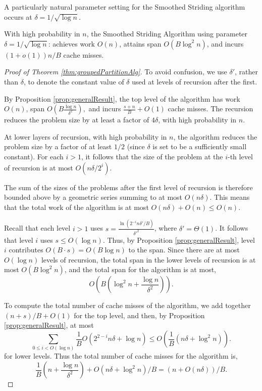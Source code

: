 \documentclass[a4paper,UKenglish,cleveref, autoref, thm-restate]{lipics-v2019}
\begin{document}
A particularly natural parameter setting for the 
Smoothed Striding algorithm occurs at $\delta = 1 / \sqrt{\log n}$.
\begin{corollary}
  \label{cor:groupedPartitionAlg} With high probability in $n$,
  the Smoothed Striding Algorithm using parameter
  $\delta=1/\sqrt{\log n}$: achieves work $O(n)$, attains span
  $O(B\log^2 n)$, and incurs $(1 + o(1))n/B$ cache misses. 
\end{corollary}

\begin{proof}[Proof of Theorem \ref{thm:groupedPartitionAlg}]
  To avoid confusion, we use $\delta'$, rather than $\delta$, to
  denote the constant value of $\delta$ used at levels of recursion
  after the first.
  
  
  By Proposition \ref{prop:generalResult}, the top level of the algorithm
  has work $O(n)$, span $O\left(B\frac{\log n}{\delta^2}\right),$ and
  incurs $\frac{s+n}{B} + O(1)$ cache misses.  The recursion reduces
  the problem size by at least a factor of $4\delta$, with high
  probability in $n$.

  At lower layers of recursion, with high probability in $n$, the
  algorithm reduces the problem size by a factor of at least
  $1/2$ (since $\delta$ is set to be a sufficiently small
  constant). For each $i > 1$, it follows that the size of the
  problem at the $i$-th level of recursion is at most $O(n \delta
  / 2^i)$.
  
  The sum of the sizes of the problems after the first level of
  recursion is therefore bounded above by a geometric series summing to at most $O(n
  \delta)$. This means that the total work of the algorithm is at most
  $O(n\delta) + O(n) \le O(n)$.

  Recall that each level $i > 1$ uses $s =
  \frac{\ln(2^{-i}n\delta'/B)}{\delta'^2}$, where $\delta' =
  \Theta(1)$. It follows that level $i$ uses $s \le O(\log n)$.
  Thus, by Proposition \ref{prop:generalResult}, level $i$
  contributes $O(B\cdot s)=O(B \log n)$ to the span.  Since there
  are at most  $O(\log n)$ levels of recursion, the total span in
  the lower levels of recursion is at most $O(B\log^2 n)$, and
  the total span for the algorithm is at most,
  $$O\left(B\left(\log^2 n + \frac{\log
  n}{\delta^2}\right)\right).$$
        
  To compute the total number of cache misses of the algorithm,
  we add together $(n+s)/B+O(1)$ for the top level, and then, by
  Proposition \ref{prop:generalResult}, at most $$\sum_{0 \leq i<
    O(\log n)}\frac{1}{B} O\left(2^{2-i}n\delta + \log n\right) \le
  O\left(\frac{1}{B} (n \delta + \log^2 n)\right).$$ for lower
  levels. Thus the total number of cache misses for the algorithm
  is, $$\frac{1}{B}\left(n+\frac{\log n}{\delta^2 }\right) +
  O(n\delta + \log^2 n) / B = (n+O(n\delta))/B.$$ 
\end{proof}
\end{document}
